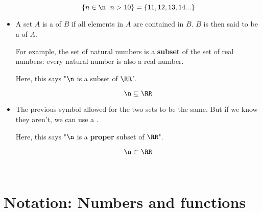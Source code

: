 \begin{itemize}
            \begin{equation}
                \{ n \in \n \,|\, n > 10 \} = \{11, 12, 13, 14...\}
            \end{equation}
            
        \item A set $A$ is a  of $B$ if all elements in $A$ are contained in $B$.
        $B$ is then said to be a  of $A$.
        
        For example, the set of natural numbers is a \textbf{subset} of the set of real numbers: every natural number is also a real number.
        
        Here, this says "$\n$ is a subset of $\RR$".
        
            \begin{equation}
                \n \subseteq \RR
            \end{equation}
            
        \item The previous symbol allowed for the two sets to be the same. But if we know they aren't, we can use a .
        
        Here, this says "$\n$ is a \textbf{proper} subset of $\RR$".
        
            \begin{equation}
                \n \subset \RR
            \end{equation}
            
        \
    \end{itemize}

\section{Notation: Numbers and functions}

